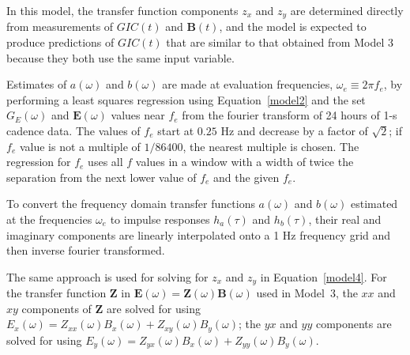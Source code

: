 \documentclass[draft,linenumbers]{agujournal2018}
\begin{document}
\noindent
In this model, the transfer function components $z_x$ and $z_y$ are determined directly from measurements of $GIC(t)$ and $\mathbf{B}(t)$, and the model is expected to produce predictions of $GIC(t)$ that are similar to that obtained from Model 3 because they both use the same input variable.

Estimates of $a(\omega)$ and $b(\omega)$ are made at evaluation frequencies, $\omega_e \equiv 2\pi f_e$, by performing a least squares regression using Equation~\ref{model2} and the set $G_E(\omega)$ and $\mathbf{E}(\omega)$ values near $f_e$ from the fourier transform of 24 hours of 1-s cadence data. The values of $f_e$ start at $0.25$ Hz and decrease by a factor of $\sqrt{2}$; if $f_e$ value is not a multiple of $1/86400$, the nearest multiple is chosen. The regression for $f_e$ uses all $f$ values in a window with a width of twice the separation from the next lower value of $f_e$ and the given $f_e$.

To convert the frequency domain transfer functions $a(\omega)$ and $b(\omega)$ estimated at the frequencies $\omega_e$ to impulse responses $h_a(\tau)$ and $h_b(\tau)$, their real and imaginary components are linearly interpolated onto a 1 Hz frequency grid and then inverse fourier transformed.  

The same approach is used for solving for $z_x$ and $z_y$ in Equation~\ref{model4}. For the transfer function $\boldsymbol{Z}$ in $\mathbf{E}(\omega) = \boldsymbol{Z}(\omega)\mathbf{B}(\omega)$ used in Model~3, the $xx$ and $xy$ components of $\boldsymbol{Z}$ are solved for using $E_x(\omega) = Z_{xx}(\omega)B_x(\omega) + Z_{xy}(\omega)B_{y}(\omega)$; the $yx$ and $yy$ components are solved for using $E_y(\omega) = Z_{yx}(\omega)B_x(\omega) + Z_{yy}(\omega)B_y(\omega)$.


\end{document}
